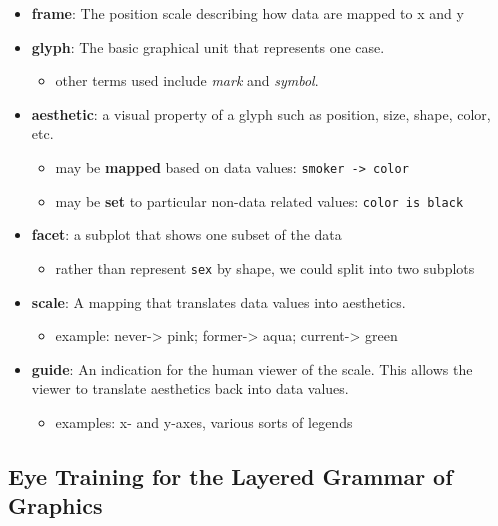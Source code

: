 \documentclass[
  letterpaper,
  DIV=11,
  numbers=noendperiod]{scrreprt}
\providecommand{\tightlist}{%
  \setlength{\itemsep}{0pt}\setlength{\parskip}{0pt}}\usepackage{longtable,booktabs,array}
\begin{document}
\begin{itemize}
\item
  \textbf{frame}: The position scale describing how data are mapped to x
  and y
\item
  \textbf{glyph}: The basic graphical unit that represents one case.

  \begin{itemize}
  \tightlist
  \item
    other terms used include \emph{mark} and \emph{symbol}.
  \end{itemize}
\item
  \textbf{aesthetic}: a visual property of a glyph such as position,
  size, shape, color, etc.

  \begin{itemize}
  \tightlist
  \item
    may be \textbf{mapped} based on data values:
    \texttt{smoker\ -\textgreater{}\ color}
  \item
    may be \textbf{set} to particular non-data related values:
    \texttt{color\ is\ black}
  \end{itemize}
\item
  \textbf{facet}: a subplot that shows one subset of the data

  \begin{itemize}
  \tightlist
  \item
    rather than represent \texttt{sex} by shape, we could split into two
    subplots
  \end{itemize}
\item
  \textbf{scale}: A mapping that translates data values into aesthetics.

  \begin{itemize}
  \tightlist
  \item
    example: never-\textgreater{} pink; former-\textgreater{} aqua;
    current-\textgreater{} green
  \end{itemize}
\item
  \textbf{guide}: An indication for the human viewer of the scale. This
  allows the viewer to translate aesthetics back into data values.

  \begin{itemize}
  \tightlist
  \item
    examples: x- and y-axes, various sorts of legends
  \end{itemize}
\end{itemize}

\subsection*{Eye Training for the Layered Grammar of
Graphics}\label{eye-training-for-the-layered-grammar-of-graphics}
\end{document}
